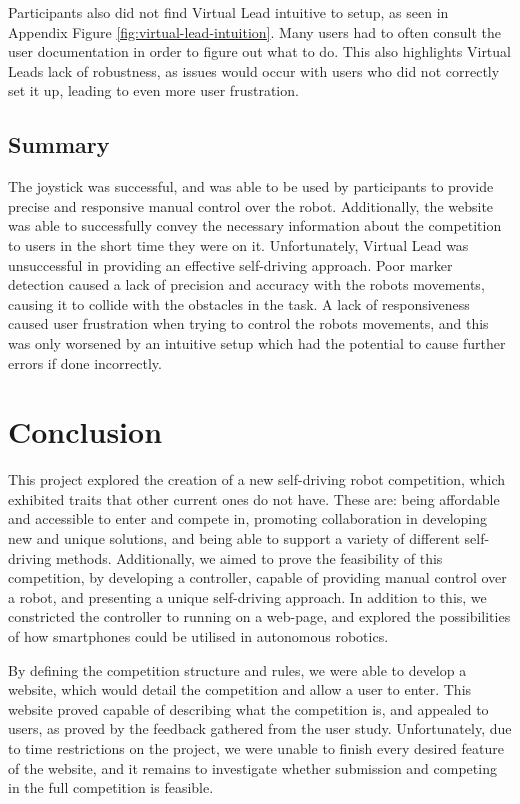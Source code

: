 \documentclass{l4proj}
\begin{document}
Participants also did not find Virtual Lead intuitive to setup, as seen in Appendix Figure \ref{fig:virtual-lead-intuition}. Many users had to often consult the user documentation in order to figure out what to do. This also highlights Virtual Leads lack of robustness, as issues would occur with users who did not correctly set it up, leading to even more user frustration.

\section{Summary}
The joystick was successful, and was able to be used by participants to provide precise and responsive manual control over the robot. Additionally, the website was able to successfully convey the necessary information about the competition to users in the short time they were on it. Unfortunately, Virtual Lead was unsuccessful in providing an effective self-driving approach. Poor marker detection caused a lack of precision and accuracy with the robots movements, causing it to collide with the obstacles in the task. A lack of responsiveness caused user frustration when trying to control the robots movements, and this was only worsened by an intuitive setup which had the potential to cause further errors if done incorrectly.



\chapter{Conclusion}    
This project explored the creation of a new self-driving robot competition, which exhibited traits that other current ones do not have. These are: being affordable and accessible to enter and compete in, promoting collaboration in developing new and unique solutions, and being able to support a variety of different self-driving methods. Additionally, we aimed to prove the feasibility of this competition, by developing a controller, capable of providing manual control over a robot, and presenting a unique self-driving approach. In addition to this, we constricted the controller to running on a web-page, and explored the possibilities of how smartphones could be utilised in autonomous robotics.

By defining the competition structure and rules, we were able to develop a website, which would detail the competition and allow a user to enter. This website proved capable of describing what the competition is, and appealed to users, as proved by the feedback gathered from the user study. Unfortunately, due to time restrictions on the project, we were unable to finish every desired feature of the website, and it remains to investigate whether submission and competing in the full competition is feasible.
\end{document}
